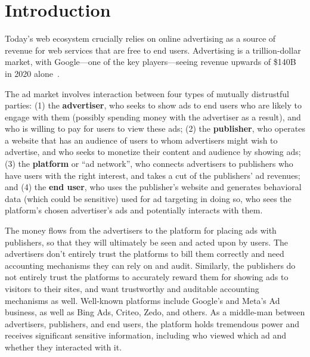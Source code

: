 \section{Introduction}
\label{s:overview}


Today's web ecosystem crucially relies on online advertising as a source of
revenue for web services that are free to end users.
%
Advertising is a trillion-dollar market, with Google---one of the key
players---seeing revenue upwards of \$140B in 2020 alone~\cite{google-ad-revenue}.
%

The ad market involves interaction between four types of mutually distrustful parties:
(1) the \textbf{advertiser}, who seeks to show ads to end users who
   are likely to engage with them (possibly spending money with the
   advertiser as a result), and who is willing to pay for users to view
   these ads;
(2) the \textbf{publisher}, who operates a website that has an audience
   of users to whom advertisers might wish to advertise, and who seeks
   to monetize their content and audience by showing ads;
 (3) the \textbf{platform} or ``ad network'', who connects advertisers
   to publishers who have users with the right interest, and takes a cut
   of the publishers' ad revenues; and
 (4) the \textbf{end user}, who uses the publisher's website and generates
   behavioral data (which could be sensitive) used for ad targeting in doing so,
   who sees the platform's chosen advertiser's ads and potentially interacts
   with them.

The money flows from the advertisers to the platform for placing ads with publishers, so that they will ultimately be seen and acted upon by users.
%
The advertisers don't entirely trust the platforms to bill them correctly and need accounting mechanisms they can rely on and audit.
%
Similarly, the publishers do not entirely trust the platforms to accurately reward them for showing ads to visitors to their sites, and want trustworthy and auditable accounting mechanisms as well.
%
Well-known platforms include Google's and Meta's Ad business, as well
as Bing Ads, Criteo, Zedo, and others.
%
As a middle-man between advertisers, publishers, and end users, the platform
holds tremendous power and receives significant sensitive information, including
who viewed which ad and whether they interacted with it.
%
%
%


